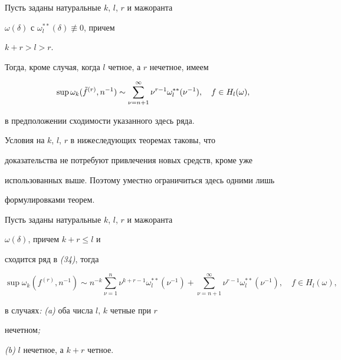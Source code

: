 \begin{thm}


Пусть заданы натуральные $k$, $l$, $r$ и мажоранта


$\omega(\delta)$ с $\omega^{**}_l(\delta)\not\equiv 0$, причем


$k+r>l>r$.


Тогда, кроме случая, когда $l$ четное, а $r$ нечетное, имеем


$$


\sup\omega_k(\Tilde f^{(r)},n^{-1})\sim


\sum^\infty_{\nu=n+1}\nu^{r-1}\omega^{**}_l(\nu^{-1}),\quad


f\in H_l(\omega),


$$


в предположении сходимости указанного здесь ряда.


\end{thm}





Условия на $k$, $l$, $r$ в нижеследующих теоремах таковы, что


доказательства не потребуют привлечения новых средств, кроме уже


использованных выше. Поэтому уместно ограничиться здесь одними лишь


формулировками теорем.





\begin{thm}


Пусть заданы натуральные $k$, $l$, $r$ и мажоранта


$\omega(\delta)$, причем $k+r\le l$ и


сходится ряд в {\em (34)}, тогда


\begin{equation}


\sup\omega_k(f^{(r)},n^{-1})\sim n^{-k}


\sum^n_{\nu=1}\nu^{k+r-1}\omega^{**}_l(\nu^{-1})+


\sum^\infty_{\nu=n+1}\nu^{r-1}\omega^{**}_l(\nu^{-1}),\quad


f\in H_l(\omega),


\end{equation}


в случаях{\em :} {\em (a)} оба числа $l$, $k$ четные при $r$


нечетном{\em ;}


{\em (b)} $l$ нечетное, а $k+r$ четное.


\end{thm}





